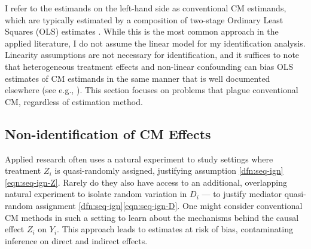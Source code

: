 
I refer to the estimands on the left-hand side as conventional CM estimands, which are typically estimated by a composition of two-stage Ordinary Least Squares (OLS) estimates \citep{imai2010identification}.
While this is the most common approach in the applied literature, I do not assume the linear model for my identification analysis.
Linearity assumptions are not necessary for identification, and it suffices to note that heterogeneous treatment effects and non-linear confounding can bias OLS estimates of CM estimands in the same manner that is well documented elsewhere (see e.g., \citealt{angrist1998estimating,sloczynski2022interpreting}).
This section focuses on problems that plague conventional CM, regardless of estimation method.

\subsection{Non-identification of CM Effects}
Applied research often uses a natural experiment to study settings where treatment $Z_i$ is quasi-randomly assigned, justifying assumption \ref{dfn:seq-ign}\eqref{eqn:seq-ign-Z}.
Rarely do they also have access to an additional, overlapping natural experiment to isolate random variation in $D_i$ --- to justify mediator quasi-random assignment \ref{dfn:seq-ign}\eqref{eqn:seq-ign-D}.
One might consider conventional CM methods in such a setting to learn about the mechanisms behind the causal effect $Z_i$ on $Y_i$.
This approach leads to estimates at risk of bias, contaminating inference on direct and indirect effects.

